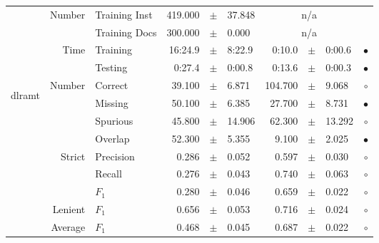 \begin{longtable}{|r|r|l||rcl|rcl|c|}
\cline{2-10} & \multirow{2}{*}{    Number} &   Training Inst &     419.000 &  $\pm$  &      37.848 &    \multicolumn{3}{c|}{n/a}         &  \\
\cline{3-10} &                             &   Training Docs &     300.000 &  $\pm$  &       0.000 &    \multicolumn{3}{c|}{n/a}         &  \\
\cline{2-10} & \multirow{2}{*}{      Time} &        Training &     16:24.9 &  $\pm$  &      8:22.9 &      0:10.0 &  $\pm$  &      0:00.6 & $\bullet$ \\
\cline{3-10} &                             &         Testing &      0:27.4 &  $\pm$  &      0:00.8 &      0:13.6 &  $\pm$  &      0:00.3 & $\bullet$ \\
\hline
\hline
\multirow{11}{*}{\begin{sideways}dlramt\end{sideways} }
             & \multirow{4}{*}{    Number} &         Correct &      39.100 &  $\pm$  &       6.871 &     104.700 &  $\pm$  &       9.068 & $\circ$ \\
\cline{3-10} &                             &         Missing &      50.100 &  $\pm$  &       6.385 &      27.700 &  $\pm$  &       8.731 & $\bullet$ \\
\cline{3-10} &                             &        Spurious &      45.800 &  $\pm$  &      14.906 &      62.300 &  $\pm$  &      13.292 & $\circ$ \\
\cline{3-10} &                             &         Overlap &      52.300 &  $\pm$  &       5.355 &       9.100 &  $\pm$  &       2.025 & $\bullet$ \\
\cline{2-10} & \multirow{3}{*}{    Strict} &       Precision &       0.286 &  $\pm$  &       0.052 &       0.597 &  $\pm$  &       0.030 & $\circ$ \\
\cline{3-10} &                             &          Recall &       0.276 &  $\pm$  &       0.043 &       0.740 &  $\pm$  &       0.063 & $\circ$ \\
\cline{3-10} &                             &           $F_1$ &       0.280 &  $\pm$  &       0.046 &       0.659 &  $\pm$  &       0.022 & $\circ$ \\
\cline{2-10} &                     Lenient &           $F_1$ &       0.656 &  $\pm$  &       0.053 &       0.716 &  $\pm$  &       0.024 & $\circ$ \\
\cline{2-10} &                     Average &           $F_1$ &       0.468 &  $\pm$  &       0.045 &       0.687 &  $\pm$  &       0.022 & $\circ$ \\

\end{longtable}
